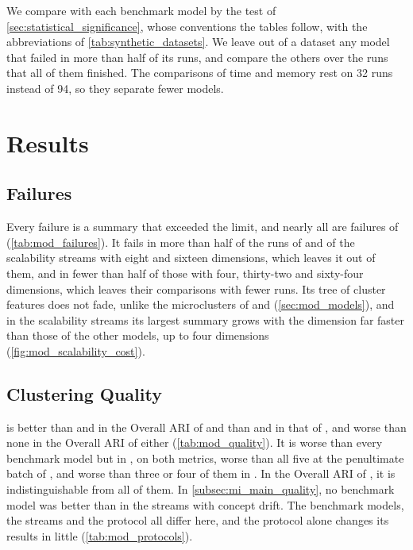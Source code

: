 We compare \MicroTEDAClusPlus with each benchmark model by the test of \cref{sec:statistical_significance}, whose conventions the tables follow, with the abbreviations of \cref{tab:synthetic_datasets}. We leave out of a dataset any model that failed in more than half of its runs, and compare the others over the runs that all of them finished. The comparisons of time and memory rest on 32 runs instead of 94, so they separate fewer models.

\section{Results}
\label{sec:mod_results}

\subsection{Failures}
\label{subsec:mod_failures}



Every failure is a summary that exceeded the limit, and nearly all are failures of \BIRCH (\cref{tab:mod_failures}). It fails in more than half of the runs of \BenchmarkOne and of the scalability streams with eight and sixteen dimensions, which leaves it out of them, and in fewer than half of those with four, thirty-two and sixty-four dimensions, which leaves their comparisons with fewer runs. Its tree of cluster features does not fade, unlike the microclusters of \DenStream and \DBSTREAM (\cref{sec:mod_models}), and in the scalability streams its largest summary grows with the dimension far faster than those of the other models, up to four dimensions (\cref{fig:mod_scalability_cost}).

\subsection{Clustering Quality}
\label{subsec:mod_quality}



\MicroTEDAClusPlus is better than \DenStream and \MiniBatchKMeans in the Overall ARI of \BenchmarkOne and than \DBSTREAM and \BICO in that of \Cassini, and worse than none in the Overall ARI of either (\cref{tab:mod_quality}). It is worse than every benchmark model but \DenStream in \BenchmarkTwo, on both metrics, worse than all five at the penultimate batch of \RandomRBFGeneratorEvents, and worse than three or four of them in \ChameleonDSThree. In the Overall ARI of \ChameleonDSFour, it is indistinguishable from all of them. In \cref{subsec:mi_main_quality}, no benchmark model was better than \MicroTEDAClusPlus in the streams with concept drift. The benchmark models, the streams and the protocol all differ here, and the protocol alone changes its results in \BenchmarkTwo little (\cref{tab:mod_protocols}).

